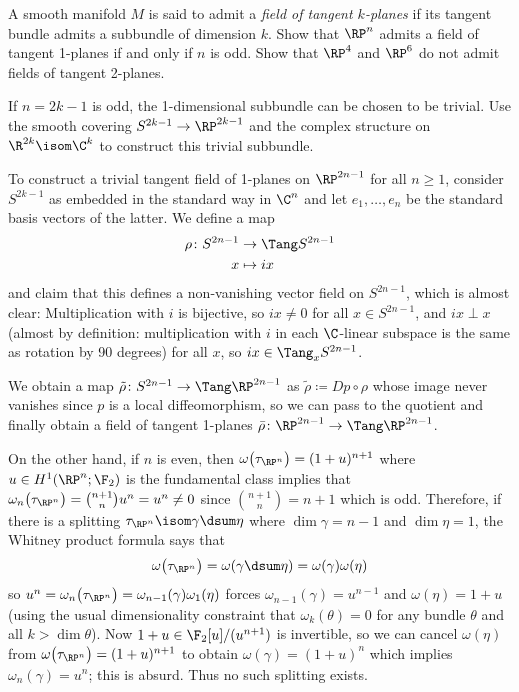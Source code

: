 \begin{exercise}
	A smooth manifold $M$ is said to admit a \emph{field of tangent $k$-planes} if its tangent bundle admits a subbundle of dimension $k$.
	Show that $\RP^n$ admits a field of tangent 1-planes if and only if $n$ is odd.
	Show that $\RP^4$ and $\RP^6$ do not admit fields of tangent 2-planes.
	\begin{hint}
		If $n = 2k - 1$ is odd, the 1-dimensional subbundle can be chosen to be trivial.
		Use the smooth covering $S^{2k - 1} \to \RP^{2k - 1}$ and the complex structure on $\R^{2k} \isom \C^k$ to construct this trivial subbundle.
	\end{hint}
\end{exercise}
\begin{solution}
	To construct a trivial tangent field of 1-planes on $\RP^{2n - 1}$ for all $n \geq 1$, consider $S^{2k - 1}$ as embedded in the standard way in $\C^n$ and let $e_1, \ldots, e_n$ be the standard basis vectors of the latter. 
	We define a map 
	\begin{align*}
		\rho\colon S^{2n - 1} &\to \Tang S^{2n - 1} \\
		x &\mapsto i x
	\end{align*}
	and claim that this defines a non-vanishing vector field on $S^{2n - 1}$, which is almost clear:
	Multiplication with $i$ is bijective, so $i x \neq 0$ for all $x \in S^{2n - 1}$, and $ix \perp x$ (almost by definition: multiplication with $i$ in each $\C$-linear subspace is the same as rotation by 90 degrees) for all $x$, so $ix \in \Tang_x S^{2n - 1}$.

	We obtain a map $\tilde{\rho}\colon S^{2n - 1} \to \Tang \RP^{2n - 1}$ as $\tilde{\rho} \coloneq D p \circ \rho$ whose image never vanishes since $p$ is a local diffeomorphism, so we can pass to the quotient and finally obtain a field of tangent 1-planes $\bar{\rho}\colon \RP^{2n - 1} \to \Tang \RP^{2n - 1}$.

	On the other hand, if $n$ is even, then $\omega\big(\tau_{\RP^n}\big) = (1 + u)^{n + 1}$ where $u \in H^1(\RP^n; \F_2)$ is the fundamental class implies that $\omega_n\big(\tau_{\RP^n}\big) = \binom{n + 1}{n} u^n = u^n \neq 0$ since $\binom{n + 1}{n} = n + 1$ which is odd.
	Therefore, if there is a splitting $\tau_{\RP^n} \isom \gamma \dsum \eta$ where $\dim \gamma = n - 1$ and $\dim \eta = 1$, the Whitney product formula says that
	\begin{equation*}
		\omega\big(\tau_{\RP^n}\big) = \omega(\gamma \dsum \eta) = \omega(\gamma) \omega(\eta)
	\end{equation*}
	so $u^n = \omega_n\big(\tau_{\RP^n}\big) = \omega_{n - 1}(\gamma) \omega_1(\eta)$ forces $\omega_{n - 1}(\gamma) = u^{n - 1}$ and $\omega(\eta) = 1 + u$ (using the usual dimensionality constraint that $\omega_k(\theta) = 0$ for any bundle $\theta$ and all $k > \dim \theta$).
	Now $1 + u \in \F_2[u] / (u^{n + 1})$ is invertible, so we can cancel $\omega(\eta)$ from $\omega\big(\tau_{\RP^n}\big) = (1 + u)^{n + 1}$ to obtain $\omega(\gamma) = (1 + u)^n$ which implies $\omega_n(\gamma) = u^n$; this is absurd.
	Thus no such splitting exists.


\end{solution}
